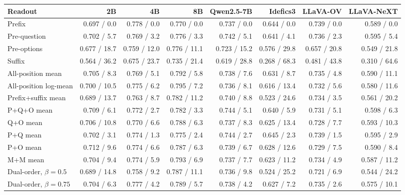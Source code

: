 \begin{tabular}{lrrrrrrr}
\toprule
Readout & 2B & 4B & 8B & Qwen2.5-7B & Idefics3 & LLaVA-OV & LLaVA-NeXT \\
\midrule
Prefix & 0.697 / 0.0 & 0.778 / 0.0 & 0.770 / 0.0 & 0.737 / 0.0 & 0.644 / 0.0 & 0.739 / 0.0 & 0.589 / 0.0 \\
Pre-question & 0.702 / 5.7 & 0.769 / 3.2 & 0.776 / 3.3 & 0.742 / 5.1 & 0.641 / 4.1 & 0.736 / 2.3 & 0.595 / 5.4 \\
Pre-options & 0.677 / 18.7 & 0.759 / 12.0 & 0.776 / 11.1 & 0.723 / 15.2 & 0.576 / 29.8 & 0.657 / 20.8 & 0.549 / 21.8 \\
Suffix & 0.564 / 36.2 & 0.675 / 23.7 & 0.735 / 21.4 & 0.619 / 28.8 & 0.268 / 68.3 & 0.481 / 43.8 & 0.310 / 64.6 \\
All-position mean & 0.705 / 8.3 & 0.769 / 5.1 & 0.792 / 5.8 & 0.738 / 7.6 & 0.631 / 8.7 & 0.735 / 4.8 & 0.590 / 11.1 \\
All-position log-mean & 0.700 / 10.5 & 0.775 / 6.2 & 0.795 / 7.2 & 0.736 / 8.1 & 0.616 / 13.4 & 0.732 / 5.6 & 0.580 / 11.6 \\
Prefix+suffix mean & 0.689 / 13.7 & 0.763 / 8.7 & 0.782 / 11.2 & 0.740 / 8.8 & 0.523 / 24.6 & 0.734 / 3.5 & 0.561 / 20.2 \\
P+Q+O mean & 0.709 / 6.1 & 0.772 / 2.7 & 0.782 / 3.3 & 0.744 / 5.1 & 0.640 / 5.9 & 0.731 / 5.1 & 0.598 / 6.3 \\
Q+O mean & 0.706 / 10.8 & 0.770 / 6.6 & 0.788 / 6.3 & 0.737 / 8.3 & 0.625 / 13.4 & 0.728 / 7.7 & 0.593 / 10.3 \\
P+Q mean & 0.702 / 3.1 & 0.774 / 1.3 & 0.775 / 2.4 & 0.744 / 2.7 & 0.645 / 2.3 & 0.739 / 1.5 & 0.595 / 2.9 \\
P+O mean & 0.712 / 9.6 & 0.774 / 6.6 & 0.787 / 6.3 & 0.739 / 6.7 & 0.628 / 12.6 & 0.729 / 7.5 & 0.590 / 8.4 \\
M+M mean & 0.704 / 9.4 & 0.774 / 5.9 & 0.793 / 6.9 & 0.737 / 7.7 & 0.623 / 11.2 & 0.734 / 4.9 & 0.587 / 11.2 \\
Dual-order, $\beta{=}0.5$ & 0.689 / 14.8 & 0.758 / 9.2 & 0.787 / 11.1 & 0.736 / 9.8 & 0.524 / 25.2 & 0.721 / 6.9 & 0.544 / 24.2 \\
Dual-order, $\beta{=}0.75$ & 0.704 / 6.3 & 0.777 / 4.2 & 0.789 / 5.7 & 0.738 / 4.2 & 0.627 / 7.2 & 0.735 / 2.6 & 0.575 / 10.1 \\
\bottomrule
\end{tabular}
